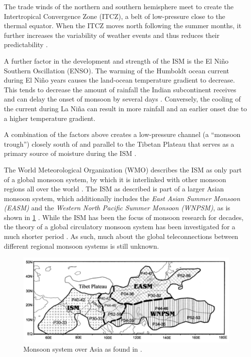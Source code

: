 The trade winds of the northern and southern hemisphere meet to create the Intertropical Convergence Zone (ITCZ), a belt of low-pressure close to the thermal equator. When the ITCZ moves north following the summer months, it further increases the variability of weather events and thus reduces their predictability \citep{Stolbova.2015}.

A further factor in the development and strength of the ISM is the El Niño Southern Oscillation (ENSO). The warming of the Humboldt ocean current during El Niño years causes the land-ocean temperature gradient to decrease. This tends to decrease the amount of rainfall the Indian subcontinent receives and can delay the onset of monsoon by several days \citep{Pradhan.2017, Willetts.2017}. Conversely, the cooling of the current during La Niña can result in more rainfall and an earlier onset due to a higher temperature gradient.

A combination of the factors above creates a low-pressure channel (a ``monsoon trough'') closely south of and parallel to the Tibetan Plateau that serves as a primary source of moisture during the ISM \citep{Stolbova.2015}.

The World Meteorological Organization (WMO) describes the ISM as only part of a global monsoon system, by which it is interlinked with other monsoon regions all over the world \citep{WorldMeteorologicalOrganization.2005}. The ISM as described is part of a larger Asian monsoon system, which additionally includes the \textit{East Asian Summer Monsoon (EASM)} and the \textit{Western North Pacific Summer Monsoon (WNPSM)}, as is shown in \cref{fig:monsoon_system} \citep{Yihui.2005}. While the ISM has been the focus of monsoon research for decades, the theory of a global circulatory monsoon system has been investigated for a much shorter period \citep{WorldMeteorologicalOrganization.2005}. As such, much about the global teleconnections between different regional monsoon systems is still unknown.

\begin{figure}[h]
  \centering
  \includegraphics[width=0.55\linewidth]{./99_appendix/img/monsoon_system}
  \caption{Monsoon system over Asia as found in \citet{Yihui.2005}.}
  \label{fig:monsoon_system}
\end{figure}

